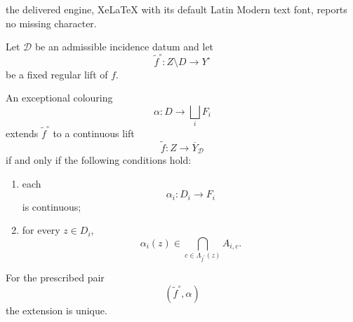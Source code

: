 \documentclass[10pt,a4paper]{amsart}
\begin{document}
the delivered engine, XeLaTeX with its default Latin Modern text font, reports no missing character.
\begin{theorem}
\label{thm:incidence-lift}
Let $\mathcal D$ be an admissible incidence datum and let
\[
\widetilde f^\circ:
Z\setminus D\to Y^\circ
\]
be a fixed regular lift of $f$.

An exceptional colouring
\[
\alpha:D\to\bigsqcup_iF_i
\]
extends $\widetilde f^\circ$ to a continuous lift
\[
\widetilde f:
Z\longrightarrow\overline Y_{\mathcal D}
\]
if and only if the following conditions hold:
\begin{enumerate}[label=(\roman*)]
\item each
\[
\alpha_i:D_i\to F_i
\]
is continuous;
\item for every $z\in D_i$,
\[
\alpha_i(z)
\in
\bigcap_{c\in
\Lambda_{\widetilde f^\circ}(z)}
A_{i,c}.
\]
\end{enumerate}
For the prescribed pair
\[
(\widetilde f^\circ,\alpha)
\]
the extension is unique.
\end{theorem}
\end{document}
